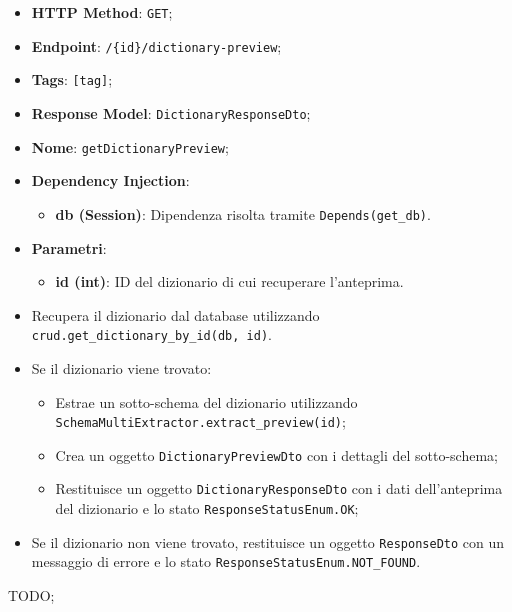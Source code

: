 \begin{itemize}
 \item \textbf{HTTP Method}: \texttt{GET};
 \item \textbf{Endpoint}: \texttt{/\{id\}/dictionary-preview};
 \item \textbf{Tags}: \texttt{[tag]};
 \item \textbf{Response Model}: \texttt{DictionaryResponseDto};
 \item \textbf{Nome}: \texttt{getDictionaryPreview};
 \item \textbf{Dependency Injection}:
  \begin{itemize}
    \item \textbf{db (Session)}: Dipendenza risolta tramite \texttt{Depends(get\_db)}.
  \end{itemize}
 \item \textbf{Parametri}:
  \begin{itemize}
    \item \textbf{id (int)}: ID del dizionario di cui recuperare l'anteprima.
  \end{itemize}
\end{itemize}

\begin{itemize}
 \item Recupera il dizionario dal database utilizzando \texttt{crud.get\_dictionary\_by\_id(db, id)}.
 \item Se il dizionario viene trovato:
  \begin{itemize}
    \item Estrae un sotto-schema del dizionario utilizzando \texttt{SchemaMultiExtractor.extract\_preview(id)};
    \item Crea un oggetto \texttt{DictionaryPreviewDto} con i dettagli del sotto-schema;
    \item Restituisce un oggetto \texttt{DictionaryResponseDto} con i dati dell'anteprima del dizionario e lo stato \texttt{ResponseStatusEnum.OK};
  \end{itemize}
 \item Se il dizionario non viene trovato, restituisce un oggetto \texttt{ResponseDto} con un messaggio di errore e lo stato \texttt{ResponseStatusEnum.NOT\_FOUND}.
\end{itemize}

\par TODO;

